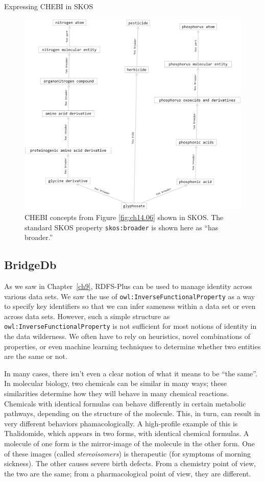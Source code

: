 \begin{challenge}{Expressing CHEBI in SKOS}
\begin{figure}
\centering
\includegraphics[width=5in]{SWWOv3/media/ch14/figure14-3.png}
\caption{CHEBI concepts from Figure \protect\ref{fig:ch14.06} shown in SKOS. The standard SKOS
property \texttt{skos:broader} is shown here as ``has broader.''
}
\label{fig:ch14.07}
\end{figure}
\end{challenge}


\subsection{BridgeDb}

As we saw in Chapter~\ref{ch9}, RDFS-Plus can be used to manage identity 
across various data sets.  We saw the use of \texttt{owl:InverseFunctionalProperty}
as a way to specify key identifiers so that we can infer sameness within a 
data set or even across data sets.  However, such a simple structure as 
\texttt{owl:InverseFunctionalProperty} is not sufficient for most notions of identity
in the data wilderness.  We often have to rely on heuristics, novel combinations
of properties, or even machine learning techniques to determine whether two 
entities are the same or not. 


In many cases, there isn't even a clear notion of what it means to be ``the same''.  
In molecular biology, two chemicals can be similar in many ways; these similarities 
determine how they will behave in many chemical reactions.  Chemicals with identical
formulas can behave differently in certain metabolic pathways, depending on the 
structure of the molecule.  This, in turn, can result in very different behaviors
phamacologically.  A high-profile example of this is Thalidomide, which appears in 
two forms, with identical chemical formulas.  A molecule of one form is the mirror-image
of the molecule in the other form.  One of these images (called \emph{stereoisomers}) 
is therapeutic (for symptoms of morning sickness).  The other causes severe birth
defects.  From a chemistry point of view, the two are the same; from a pharmacological 
point of view, they are different.  

